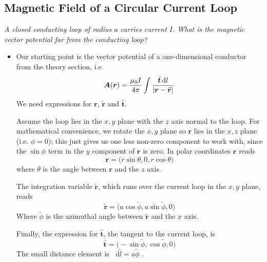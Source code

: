 \documentclass[11pt, a4paper]{article}
\newcommand{\diff}{\mathop{}\!\mathrm{d}} %
\renewcommand{\vec}[1]{\bm{#1}} %
\newcommand{\uvec}[1]{\hat{\vec{#1}}} %
\newcommand{\tvec}[1]{\tilde{\vec{#1}}} %
\renewcommand{\r}{\vec{r}}
\newcommand{\A}{\vec{A}}  %
\begin{document}
\subsection{Magnetic Field of a Circular Current Loop}
\textit{A closed conducting loop of radius $ a $ carries current $ I $. What is the magnetic vector potential far from the conducting loop?}
\begin{itemize}
	\item Our starting point is the vector potential of a one-dimensional conductor from the theory section, i.e.
	\begin{equation*}
		\A(\r) = \frac{\mu_{0}I}{4\pi} \int \frac{\uvec{t} \diff l}{\abs{\r - \tvec{r}}}
	\end{equation*}
	We need expressions for $ \r $, $ \tvec{r} $ and $ \uvec{t} $.
	
	Assume the loop lies in the $ x, y $ plane with the $ z $ axis normal to the loop. For mathematical convenience, we rotate the $ x, y $ plane so $ \r $ lies in the $ x, z $ plane (i.e. $ \phi = 0 $); this just gives us one less non-zero component to work with, since the $ \sin \phi $ term in the $ y $ component of $ \r $ is zero. In polar coordinates $ \r $ reads
	\begin{equation*}
		\r = \big (r \sin \theta, 0, r \cos \theta \big )
	\end{equation*}
	where $ \theta $ is the angle between $ \r $ and the $ z $ axis. 
	
	The integration variable $ \tvec{r} $, which runs over the current loop in the $ x, y $ plane, reads
	\begin{equation*}
		\tvec{r} = \big(a \cos \tilde{\phi}, a \sin \tilde{\phi}, 0 \big)
	\end{equation*}
	Where $ \tilde{\phi} $ is the azimuthal angle between $ \tvec{r} $ and the $ x $ axis. 
	
	Finally, the expression for $ \uvec{t} $, the tangent to the current loop, is
	\begin{equation*}
		\uvec{t} = \big( -\sin \tilde{\phi},  \cos \tilde{\phi}, 0\big)
	\end{equation*}
	The small distance element is $ \diff \tilde{l} = a \tilde{\phi}$ .
	

\end{itemize}
\end{document}
